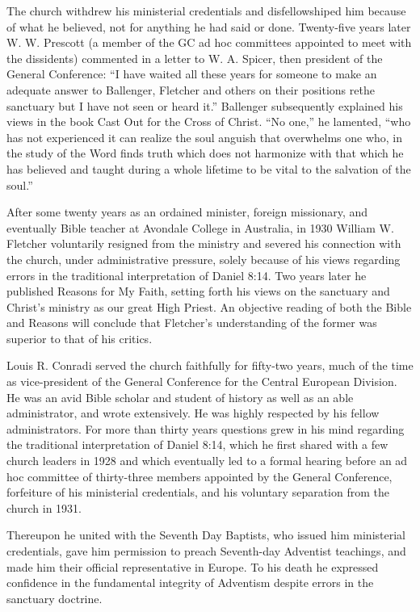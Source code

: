 The church withdrew his ministerial credentials and disfellowshiped him
because of what he believed, not for anything he had said or done.
Twenty-five years later W. W. Prescott (a member of the GC ad hoc committees
appointed to meet with the dissidents) commented in a letter to W. A.
Spicer, then president of the General Conference: ``I have waited all these
years for someone to make an adequate answer to Ballenger, Fletcher and
others on their positions re\. the sanctuary but I have not seen or heard
it.'' Ballenger subsequently explained his views in the book Cast Out for the
Cross of Christ. ``No one,'' he lamented, ``who has not experienced it can
realize the soul anguish that overwhelms one who, in the study of the Word
finds truth which does not harmonize with that which he has believed and
taught during a whole lifetime to be vital to the salvation of the 
soul.''

After some twenty years as an ordained minister, foreign missionary, and
eventually Bible teacher at Avondale College in Australia, in 1930 William
W. Fletcher voluntarily resigned from the ministry and severed his
connection with the church, under administrative pressure, solely because of
his views regarding errors in the traditional interpretation of Daniel 8:14.
Two years later he published Reasons for My Faith, setting forth his views
on the sanctuary and Christ's ministry as our great High Priest. An
objective reading of both the Bible and Reasons will conclude that
Fletcher's understanding of the former was superior to that of his
critics.

Louis R. Conradi served the church faithfully for fifty-two years, much of
the time as vice-president of the General Conference for the Central
European Division. He was an avid Bible scholar and student of history as
well as an able administrator, and wrote extensively. He was highly
respected by his fellow administrators. For more than thirty years questions
grew in his mind regarding the traditional interpretation of Daniel 8:14,
which he first shared with a few church leaders in 1928 and which eventually
led to a formal hearing before an ad hoc committee of thirty-three members
appointed by the General Conference, forfeiture of his ministerial
credentials, and his voluntary separation from the church in 1931. 

Thereupon he united with the Seventh Day Baptists, who issued him
ministerial credentials, gave him permission to preach Seventh-day Adventist
teachings, and made him their official representative in Europe. To his 
death he expressed confidence in the fundamental integrity of Adventism
despite errors in the sanctuary doctrine.

